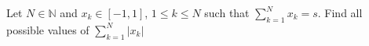 Let $N \in \mathbb{N}$ and $x_k \in [-1,1]$, $1 \le k \le N$ such that $\sum_{k=1}^N x_k =s$. Find all possible values of $\sum_{k=1}^N |x_k|$